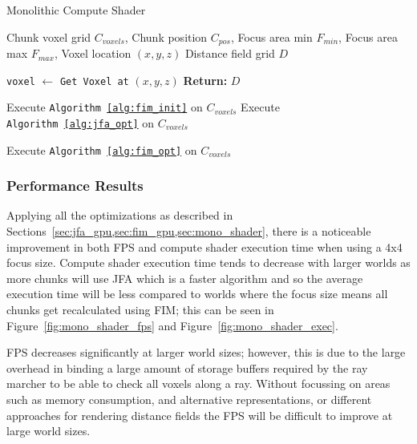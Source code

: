\begin{algorithm}[H]
    \caption{Monolithic Compute Shader}
    \label{alg:mono_shader}
    \begin{algorithmic}[1]
        \REQUIRE Chunk voxel grid \(C_{voxels}\), Chunk position \(C_{pos}\),
        Focus area min \(F_{min}\), Focus area max \(F_{max}\), Voxel location \((x, y, z)\)
        \ENSURE Distance field grid \(D\)

        \STATE \texttt{voxel} $\gets$ \texttt{Get Voxel at} \((x, y, z)\)
        \STATE \textbf{Return:} \(D\)
        \ENDIF

        \STATE Execute \texttt{Algorithm~\ref{alg:fim_init}} on $C_{voxels}$
        \STATE Execute \texttt{Algorithm~\ref{alg:jfa_opt}} on $C_{voxels}$

        \STATE Execute \texttt{Algorithm~\ref{alg:fim_opt}} on $C_{voxels}$
        \ENDIF
    \end{algorithmic}
\end{algorithm}

\subsubsection{Performance Results}
Applying all the optimizations as described in Sections~\cref{sec:jfa_gpu,sec:fim_gpu,sec:mono_shader}, there is a
noticeable improvement in both FPS and compute shader execution time when using a 4x4 focus size. Compute shader
execution time tends to decrease with larger worlds as more chunks will use JFA which is a faster algorithm and so the
average execution time will be less compared to worlds where the focus size means all chunks get recalculated using FIM;
this can be seen in Figure~\ref{fig:mono_shader_fps} and Figure~\ref{fig:mono_shader_exec}.

FPS decreases significantly at larger world sizes; however, this is due to the large overhead in binding a large amount
of storage buffers required by the ray marcher to be able to check all voxels along a ray. Without focussing on areas
such as memory consumption, and alternative representations, or different approaches for rendering distance fields the
FPS will be difficult to improve at large world sizes.


